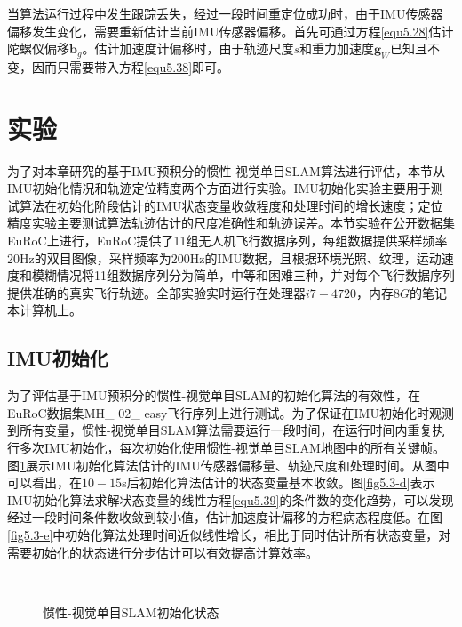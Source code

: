 当算法运行过程中发生跟踪丢失，经过一段时间重定位成功时，由于IMU传感器偏移发生变化，需要重新估计当前IMU传感器偏移。首先可通过方程\eqref{equ5.28}估计陀螺仪偏移$\boldsymbol{b}_g$。估计加速度计偏移时，由于轨迹尺度$s$和重力加速度$\boldsymbol{g}_W$已知且不变，因而只需要带入方程\eqref{equ5.38}即可。


\section{实验}
为了对本章研究的基于IMU预积分的惯性-视觉单目SLAM算法进行评估，本节从IMU初始化情况和轨迹定位精度两个方面进行实验。IMU初始化实验主要用于测试算法在初始化阶段估计的IMU状态变量收敛程度和处理时间的增长速度；定位精度实验主要测试算法轨迹估计的尺度准确性和轨迹误差。本节实验在公开数据集EuRoC\upcite{[5.4]}上进行，EuRoC提供了11组无人机飞行数据序列，每组数据提供采样频率$20$Hz的双目图像，采样频率为$200$Hz的IMU数据，且根据环境光照、纹理，运动速度和模糊情况将11组数据序列分为简单，中等和困难三种，并对每个飞行数据序列提供准确的真实飞行轨迹。全部实验实时运行在处理器$i7-4720$，内存$8G$的笔记本计算机上。

\subsection{IMU初始化}
为了评估基于IMU预积分的惯性-视觉单目SLAM的初始化算法的有效性，在EuRoC数据集MH\_ 02\_ easy飞行序列上进行测试。为了保证在IMU初始化时观测到所有变量，惯性-视觉单目SLAM算法需要运行一段时间，在运行时间内重复执行多次IMU初始化，每次初始化使用惯性-视觉单目SLAM地图中的所有关键帧。图\ref{fig5.3}展示IMU初始化算法估计的IMU传感器偏移量、轨迹尺度和处理时间。从图中可以看出，在$10-15$s后初始化算法估计的状态变量基本收敛。图\ref{fig5.3-d}表示IMU初始化算法求解状态变量的线性方程\eqref{equ5.39}的条件数的变化趋势，可以发现经过一段时间条件数收敛到较小值，估计加速度计偏移的方程病态程度低。在图\ref{fig5.3-e}中初始化算法处理时间近似线性增长，相比于同时估计所有状态变量\upcite{[5.5]}，对需要初始化的状态进行分步估计可以有效提高计算效率。

\begin{figure}[h]
    \centering
          \\
     \caption{惯性-视觉单目SLAM初始化状态}
\label{fig5.3}
\end{figure}        
          


